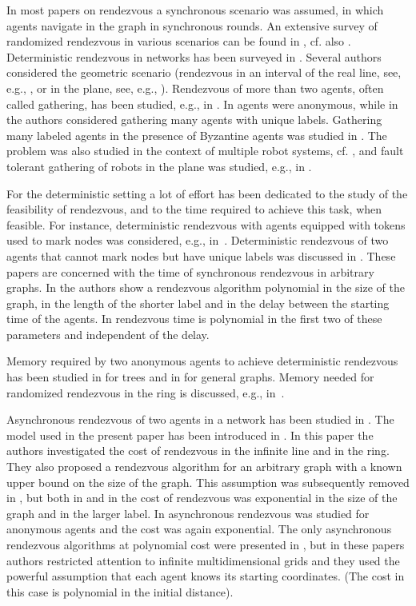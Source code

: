 \documentclass [11pt] {article}
\begin{document}
In most papers on rendezvous a synchronous scenario was assumed, in which agents navigate in the graph in synchronous rounds.
An extensive survey of  randomized rendezvous in various scenarios can be found in
\cite{alpern02b}, cf. also  \cite{alpern95a,alpern02a,alpern99,anderson90}. 
Deterministic rendezvous in networks has been surveyed in \cite{Pe}.
Several authors
considered the geometric scenario (rendezvous in an interval of the real line, see, e.g.,  \cite{baston01},
or in the plane, see, e.g., \cite{anderson98a,anderson98b}).
Rendezvous of  more than two agents, often called gathering, has been studied, e.g., 
in \cite{DiPe,DPP,lim96,YY}. In \cite{DiPe} agents were anonymous, while in~\cite{YY} the authors considered 
gathering many agents with unique labels. Gathering many labeled agents in the presence of Byzantine agents was studied in \cite{DPP}. 
The problem was also studied in the context of multiple robot systems, cf.
\cite{CP05,fpsw}, and fault tolerant gathering of robots in the plane was studied, e.g., in \cite{AP06,CP08}. 

For the deterministic setting a lot of effort has been dedicated to the study of the feasibility of rendezvous, and to the time required to achieve this task, when feasible. For instance, deterministic rendezvous with agents equipped with tokens used to mark nodes was considered, e.g., in~\cite{KKSS}. Deterministic rendezvous of two agents that cannot mark nodes but have unique labels was discussed in {\cite{DFKP,KM,TSZ14}}.
These papers are concerned with the time of synchronous rendezvous in arbitrary
graphs. In \cite{DFKP} the authors show a rendezvous algorithm polynomial in the size of the graph, in the length of the shorter
label and in the delay between the starting time of the agents. In {\cite{KM,TSZ14}} rendezvous time is polynomial in the first two of these parameters and independent of the delay.

Memory required by two anonymous agents to achieve deterministic rendezvous has been studied in \cite{FP2} for trees and in  \cite{CKP} for general graphs.
Memory needed for randomized rendezvous in the ring is discussed, e.g., {in~\cite{KKPM11}}.

Asynchronous rendezvous of two agents in a network has been studied in \cite{BCGIL,CCGL,CLP,DGKKPV,GP}. The model used in the present paper has been
introduced in \cite{DGKKPV}. In this paper  the authors investigated the cost of rendezvous in the infinite line and in the ring. They also proposed a rendezvous
algorithm for an arbitrary graph with a known upper bound on the size of the graph. This assumption was subsequently removed in \cite{CLP}, but both in
 \cite{DGKKPV} and in  \cite{CLP} the cost of rendezvous was exponential in the size of the graph and in the larger label. In \cite{GP} asynchronous rendezvous was studied for anonymous agents and the cost was again exponential. The only asynchronous rendezvous algorithms at polynomial cost were
 presented in \cite{BCGIL,CCGL}, but in these papers authors restricted attention to infinite multidimensional grids and they used 
 the powerful assumption that each agent knows its starting coordinates. (The cost in this case is polynomial in the initial distance).
 
\end{document}
